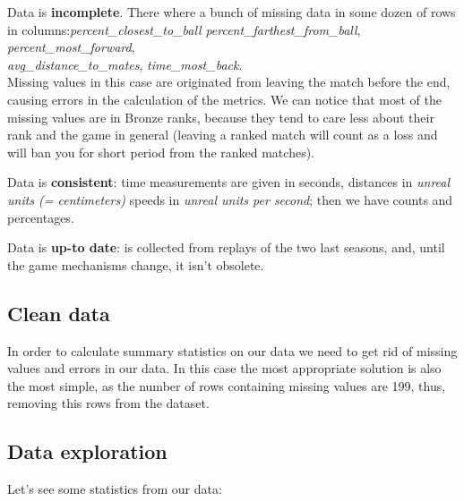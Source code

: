 Data is \textbf{incomplete}. There where a bunch of missing data in some dozen of rows in columns:\textit{percent\_closest\_to\_ball} \textit{percent\_farthest\_from\_ball}, \textit{percent\_most\_forward}, \\ \textit{avg\_distance\_to\_mates}, \textit{time\_most\_back}. \\
Missing values in this case are originated from leaving the match before the end, causing errors in the calculation of the metrics. We can notice that most of the missing values are in Bronze ranks, because they tend to care less about their rank and the game in general (leaving a ranked match will count as a loss and will ban you for short period from the ranked matches).

Data is \textbf{consistent}: time measurements are given in seconds, distances in \textit{unreal units (= centimeters)} speeds in \textit{unreal units per second}; then we have counts and percentages.

Data is \textbf{up-to date}: is collected from replays of the two last seasons, and, until the game mechanisms change, it isn't obsolete.

\subsection{Clean data}

In order to calculate summary statistics on our data we need to get rid of missing values and errors in our data.
In this case the most appropriate solution is also the most simple, as the number of rows containing missing values are 199, thus, removing this rows from the dataset.

\subsection{Data exploration}

Let's see some statistics from our data:

